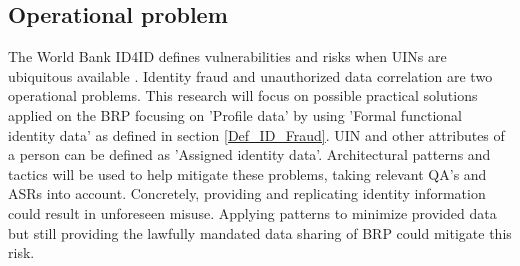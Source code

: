 \subsection{Operational problem}\label{OP}
The World Bank ID4ID defines vulnerabilities and risks when UINs are ubiquitous available \cite{WorldBank_protecting}. Identity fraud and unauthorized data correlation are two operational problems. This research will focus on possible practical solutions applied on the BRP focusing on 'Profile data' by using 'Formal functional identity data' as defined in section \ref{Def_ID_Fraud}. UIN and other attributes of a person can be defined as 'Assigned identity data'. Architectural patterns and tactics will be used to help mitigate these problems, taking relevant QA's and ASRs into account. Concretely, providing and replicating identity information could result in unforeseen misuse. Applying patterns to minimize provided data but still providing the lawfully mandated data sharing of BRP could mitigate this risk.
%
